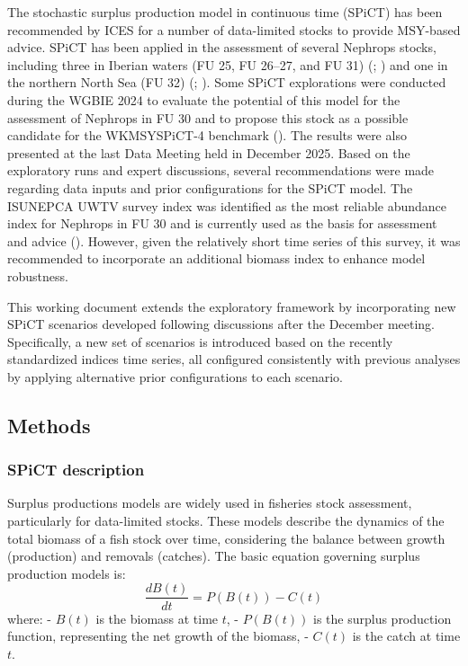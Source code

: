 \documentclass[
  12pt,
]{article}
\begin{document}
The stochastic surplus production model in continuous time (SPiCT) has been recommended by ICES for a number of data-limited stocks to provide MSY-based advice. SPiCT has been applied in the assessment of several Nephrops stocks, including three in Iberian waters (FU 25, FU 26--27, and FU 31) (; ) and one in the northern North Sea (FU 32) (; ). Some SPiCT explorations were conducted during the WGBIE 2024 to evaluate the potential of this model for the assessment of Nephrops in FU 30 and to propose this stock as a possible candidate for the WKMSYSPiCT-4 benchmark (). The results were also presented at the last Data Meeting held in December 2025. Based on the exploratory runs and expert discussions, several recommendations were made regarding data inputs and prior configurations for the SPiCT model. The ISUNEPCA UWTV survey index was identified as the most reliable abundance index for Nephrops in FU 30 and is currently used as the basis for assessment and advice (). However, given the relatively short time series of this survey, it was recommended to incorporate an additional biomass index to enhance model robustness.

This working document extends the exploratory framework by incorporating new SPiCT scenarios developed following discussions after the December meeting. Specifically, a new set of scenarios is introduced based on the recently standardized indices time series, all configured consistently with previous analyses by applying alternative prior configurations to each scenario.

\newpage

\subsection{Methods}\label{methods}

\subsubsection{SPiCT description}\label{spict-description}

Surplus productions models are widely used in fisheries stock assessment, particularly for data-limited stocks. These models describe the dynamics of the total biomass of a fish stock over time, considering the balance between growth (production) and removals (catches). The basic equation governing surplus production models is:
\[
\frac{dB(t)}{dt} = P(B(t)) - C(t)
\]
where:
- \(B(t)\) is the biomass at time \(t\),
- \(P(B(t))\) is the surplus production function, representing the net growth of the biomass,
- \(C(t)\) is the catch at time \(t\).
\end{document}
